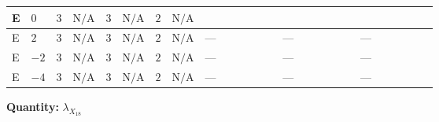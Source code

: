 \documentclass[8pt]{article}
\begin{document}
\begin{landscape}
\begin{longtable}{@{}llcccccc >{\raggedright\arraybackslash}p{0.21\linewidth} >{\raggedright\arraybackslash}p{0.21\linewidth} >{\raggedright\arraybackslash}p{0.21\linewidth}@{}}
E & $0$ & $3$ & $\text{N/A}$ & $3$ & $\text{N/A}$ & $2$ & $\text{N/A}$ & \scriptsize\adjustbox{max width=\linewidth}{$\begin{gathered} {\lambda_{X_{18}}} (6 \operatorname{Tr}\!\left({Y_d}\,\left({Y_d}\right)^{\dagger}\right)+2 \operatorname{Tr}\!\left({Y_e}\,\left({Y_e}\right)^{\dagger}\right)+6 \operatorname{Tr}\!\left({Y_u}\,\left({Y_u}\right)^{\dagger}\right))\end{gathered}$} & \scriptsize\adjustbox{max width=\linewidth}{$\begin{gathered} +4 \left({\lambda_5}\right)^{*} \left({\lambda_{X_{14}}}\right)^{*}\end{gathered}$} & \scriptsize\adjustbox{max width=\linewidth}{$\begin{gathered} +40 {\lambda_{X_{6}}} \left({\lambda_{X_{18}}}\right)^{*}\end{gathered}$} \\
\midrule
E & $2$ & $3$ & $\text{N/A}$ & $3$ & $\text{N/A}$ & $2$ & $\text{N/A}$ & --- & --- & --- \\
\midrule
E & $-2$ & $3$ & $\text{N/A}$ & $3$ & $\text{N/A}$ & $2$ & $\text{N/A}$ & --- & --- & --- \\
\midrule
E & $-4$ & $3$ & $\text{N/A}$ & $3$ & $\text{N/A}$ & $2$ & $\text{N/A}$ & --- & --- & --- \\
\midrule
\bottomrule
\end{longtable}
\clearpage
\noindent\textbf{Quantity: }${\lambda_{X_{18}}}$\par\smallskip

\end{landscape}
\end{document}
